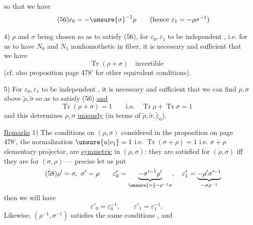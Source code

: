 
 so that we have
\[
\tag{56}
\varepsilon_0=-\unsure{\sigma}^{-1}\rho
\qquad(\text{hence }\varepsilon_1=-\rho\sigma^{-1})
\]

4) $\rho$ and $\sigma$ being chosen so as to satisfy (56), for $\varepsilon_0,\varepsilon_1$ to be  independent , i.e. for us to have $N_0$ and $N_1$ nonhomothetic in  fiber, it is necessary and sufficient that we have
\[
\tag{57}
\operatorname{Tr}(\rho+\sigma)\quad\text{invertible}
\]
(cf. also proposition page 478' for other equivalent conditions).

5) For $\varepsilon_0,\varepsilon_1$ to be independent , it is necessary and sufficient that we  can find  $\rho,\sigma$ above $\widetilde\rho,\widetilde\sigma$ so as to satisfy (56) \uline{and}
\[
\tag{57'}
\operatorname{Tr}(\rho+\sigma)=1
\qquad\text{i.e.}\quad
\operatorname{Tr}\rho+\operatorname{Tr}\sigma=1
\]
and this determines $\rho,\sigma$ \uline{uniquely} (in terms of $\widetilde\rho,\widetilde\sigma,\underline{\widetilde\varepsilon}_0$).

\uline{Remarks} 1) The conditions on $(\rho,\sigma)$ considered in the proposition on page 478',  the normalization $\unsure{u|v_1}=1$ i.e. $\operatorname{Tr}(\sigma+\rho)=1$ i.e. $\sigma+\rho$ elementary projector, are \uline{symmetric} in $(\rho,\sigma)$: they are satisfied for $(\rho,\sigma)$ iff they are for $(\sigma,\rho)$ ---   precise let us put
\[
\tag{58}
\rho'=\sigma,\ \sigma'=\rho\qquad
\varepsilon'_0=\underbrace{-\sigma'^{-1}\rho'}_{\unsure{=}-\rho^{-1}\sigma},\quad
\varepsilon'_1=\underbrace{-\rho'\sigma'^{-1}}_{-\sigma\rho^{-1}}
\]
then we will have
\[
\tag{59}
\varepsilon'_0=\varepsilon_0^{-1},\qquad
\varepsilon'_1=\varepsilon_1^{-1}.
\]
Likewise, $(\rho^{-1},\sigma^{-1})$ satisfies the same conditions , and 




